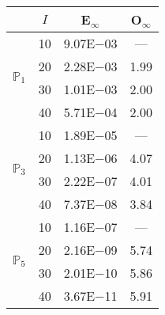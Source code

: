 \begin{table}[H]
\centering
\begin{tabular}{@{}l c c c@{}}
\toprule
 & $I$ & E$_{\infty}$ & O$_{\infty}$\\
\midrule
\multirow{4}{*}{$\mathbb{P}_{1}$}
 & 10 & 9.07E$-$03 & ---\\
 & 20 & 2.28E$-$03 & 1.99  \\
 & 30 & 1.01E$-$03 & 2.00  \\
 & 40 & 5.71E$-$04 & 2.00  \\
\midrule
\multirow{4}{*}{$\mathbb{P}_{3}$}
 & 10 & 1.89E$-$05 & ---\\
 & 20 & 1.13E$-$06 & 4.07  \\
 & 30 & 2.22E$-$07 & 4.01  \\
 & 40 & 7.37E$-$08 & 3.84  \\
\midrule
\multirow{4}{*}{$\mathbb{P}_{5}$}
 & 10 & 1.16E$-$07 & ---\\
 & 20 & 2.16E$-$09 & 5.74  \\
 & 30 & 2.01E$-$10 & 5.86  \\
 & 40 & 3.67E$-$11 & 5.91  \\
\bottomrule
\end{tabular}
\end{table}
